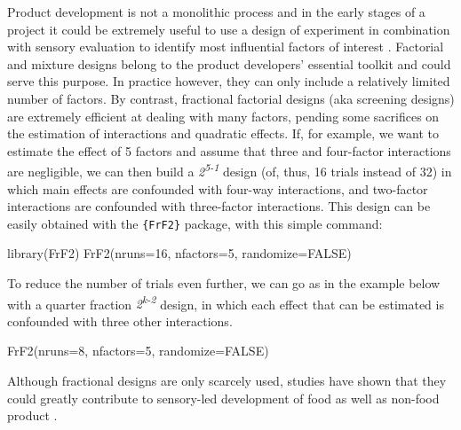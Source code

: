 \documentclass[
]{krantz}
\makeatletter
\newenvironment{Shaded}{\begin{snugshade}}{\end{snugshade}}
\newcommand{\AttributeTok}[1]{\textcolor[rgb]{0.61,0.61,0.61}{#1}}
\newcommand{\ConstantTok}[1]{\textcolor[rgb]{0,0,0}{#1}}
\newcommand{\DecValTok}[1]{\textcolor[rgb]{0.06,0.06,0.06}{#1}}
\newcommand{\FunctionTok}[1]{\textcolor[rgb]{0,0,0}{#1}}
\newcommand{\NormalTok}[1]{#1}
\newenvironment{kframe}{%
\medskip{}
\setlength{\fboxsep}{.8em}
 \def\at@end@of@kframe{}%
 \ifinner\ifhmode%
  \def\at@end@of@kframe{\end{minipage}}%
  \begin{minipage}{\columnwidth}%
 \fi\fi%
 \def\FrameCommand##1{\hskip\@totalleftmargin \hskip-\fboxsep
 \colorbox{shadecolor}{##1}\hskip-\fboxsep
     \hskip-\linewidth \hskip-\@totalleftmargin \hskip\columnwidth}%
 \MakeFramed {\advance\hsize-\width
   \@totalleftmargin\z@ \linewidth\hsize
   \@setminipage}}%
 {\par\unskip\endMakeFramed%
 \at@end@of@kframe}
\renewenvironment{Shaded}{\begin{kframe}}{\end{kframe}}
\makeatother
\begin{document}
Product development is not a monolithic process and in the early stages of a project it could be extremely useful to use a design of experiment in combination with sensory evaluation to identify most influential factors of interest \citep{Mao2007, Pineau2019}. Factorial and mixture designs belong to the product developers' essential toolkit and could serve this purpose. In practice however, they can only include a relatively limited number of factors. By contrast, fractional factorial designs (aka screening designs) are extremely efficient at dealing with many factors, pending some sacrifices on the estimation of interactions and quadratic effects. If, for example, we want to estimate the effect of 5 factors and assume that three and four-factor interactions are negligible, we can then build a \emph{2\textsuperscript{5-1}} design (of, thus, 16 trials instead of 32) in which main effects are confounded with four-way interactions, and two-factor interactions are confounded with three-factor interactions. This design can be easily obtained with the \texttt{\{FrF2\}} package, with this simple command:

\begin{Shaded}
\begin{Highlighting}[]
\FunctionTok{library}\NormalTok{(FrF2)}
\FunctionTok{FrF2}\NormalTok{(}\AttributeTok{nruns=}\DecValTok{16}\NormalTok{, }\AttributeTok{nfactors=}\DecValTok{5}\NormalTok{, }\AttributeTok{randomize=}\ConstantTok{FALSE}\NormalTok{)}
\end{Highlighting}
\end{Shaded}

To reduce the number of trials even further, we can go as in the example below with a quarter fraction \emph{2\textsuperscript{k-2}} design, in which each effect that can be estimated is confounded with three other interactions.

\begin{Shaded}
\begin{Highlighting}[]
\FunctionTok{FrF2}\NormalTok{(}\AttributeTok{nruns=}\DecValTok{8}\NormalTok{, }\AttributeTok{nfactors=}\DecValTok{5}\NormalTok{, }\AttributeTok{randomize=}\ConstantTok{FALSE}\NormalTok{)}
\end{Highlighting}
\end{Shaded}

Although fractional designs are only scarcely used, studies have shown that they could greatly contribute to sensory-led development of food \citep{Baardseth2005, Modi2008, Rytz2017, Pineau2019} as well as non-food product \citep{Dairou2003}.
\end{document}
